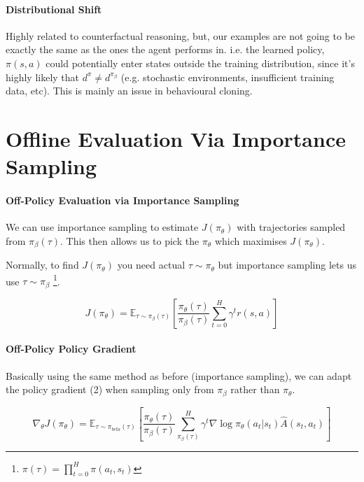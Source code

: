 \documentclass{article}
\begin{document}
\paragraph{Distributional Shift} Highly related to counterfactual reasoning, but, our examples are not going to be exactly the same as the ones the agent performs in. i.e. the learned policy, \( \pi(s,a) \) could potentially enter states outside the training distribution, since it's highly likely that \(d^{\pi} \ne d^{\pi_{\beta}}\) (e.g. stochastic environments, insufficient training data, etc). This is mainly an issue in behavioural cloning.

\section{Offline Evaluation Via Importance Sampling}

\paragraph{Off-Policy Evaluation via Importance Sampling} We can use importance sampling to estimate \(J(\pi_{\theta})\) with trajectories sampled from \(\pi_{\beta} (\tau)\). This then allows us to pick the \(\pi_{\theta}\) which maximises \(J(\pi_{\theta})\).


Normally, to find \(J(\pi_{\theta})\) you need actual \(\tau \sim \pi_{\theta} \) but importance sampling lets us use \(\tau \sim \pi_{\beta}\) \footnote{\(\pi(\tau) = \prod_{t=0}^{H} \pi(a_{t}, s_{t}) \)}.

\begin{equation}
\label{eq:4}
  J(\pi_{\theta}) = \mathbb{E}_{\tau \sim \pi_{\beta}(\tau)} \left [ \frac{\pi_{\theta}(\tau)}{\pi_{\beta}(\tau)} \sum_{t=0}^{H}\gamma^{t}r(s,a) \right ]
\end{equation}

\paragraph{Off-Policy Policy Gradient} Basically using the same method as before (importance sampling), we can adapt the policy gradient (2) when sampling only from \(\pi_{\beta}\) rather than \(\pi_{\theta}\).

\begin{equation}
  \label{eq:5}
  \nabla_{\theta} J(\pi_{\theta}) = \mathbb{E}_{\tau \sim \pi_{beta}(\tau)} \left [ \frac{\pi_{\theta}(\tau)}{\pi_{\beta}(\tau)} \sum_{\pi_{\beta}(\tau)}^{H} \gamma ^{t} \nabla \log \pi_{\theta}(a_{t}|s_{t})\hat{A}(s_{t},a_{t})  \right]
  \end{equation}
\end{document}
